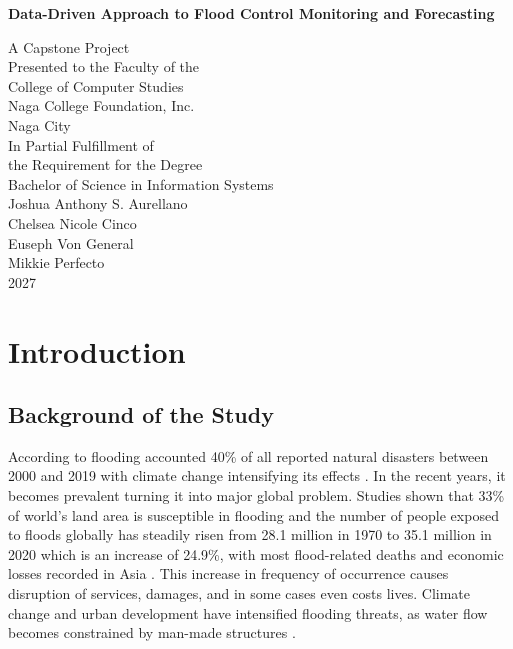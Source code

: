 \documentclass{research}
\title{}
\author{Joshua Anthony S. Aurellano, Chelsea Nicole Cinco, Euseph Von General, Mikkie Perfecto}
\begin{document}
\thispagestyle{empty}
\begin{center}
  \vspace*{1in}
  {\Huge\bfseries Data-Driven Approach to Flood Control Monitoring and Forecasting \par}
  \vspace{1in}
  A Capstone Project\\
  Presented to the Faculty of the\\
  College of Computer Studies\\
  Naga College Foundation, Inc.\\
  Naga City\\
  \vspace{1in}
  In Partial Fulfillment of\\
  the Requirement for the Degree\\
  Bachelor of Science in Information Systems\\
  \vspace{0.5in}
  Joshua Anthony S. Aurellano \\
  Chelsea Nicole Cinco \\
  Euseph Von General \\
  Mikkie Perfecto \\
  \vspace*{0.5in}
  2027
\end{center}
\clearpage

\tableofcontents
\clearpage
\listoffigures
\clearpage
\listoftables
\clearpage

\chapter{Introduction}

\section{Background of the Study}

According to \cite{Coulibaly_Loukili_Aissi_Benjelloun_Lakhrissi_2026} flooding accounted 40\%
of all reported natural disasters between 2000 and 2019 with climate change intensifying 
its effects \cite{BERKHAHN2024100167}. In the recent years, 
it becomes prevalent turning it into major global problem. Studies shown that 33\%
of world's land area is susceptible in flooding \cite{Fernando_Shrestha_Kc_Mohanasundaram_2022b} and the number of people exposed to floods 
globally has steadily risen from 28.1 million in 1970 to 35.1 million in 2020 which is an increase of 24.9\%, 
with most flood-related deaths and economic losses recorded in Asia \cite{undrr2025floods}. 
This increase in frequency of occurrence causes disruption of services, damages, and in some cases even costs lives. 
Climate change and urban development have intensified flooding threats, as water flow becomes constrained by man-made structures \cite{koutsovili2023early}.
\end{document}
